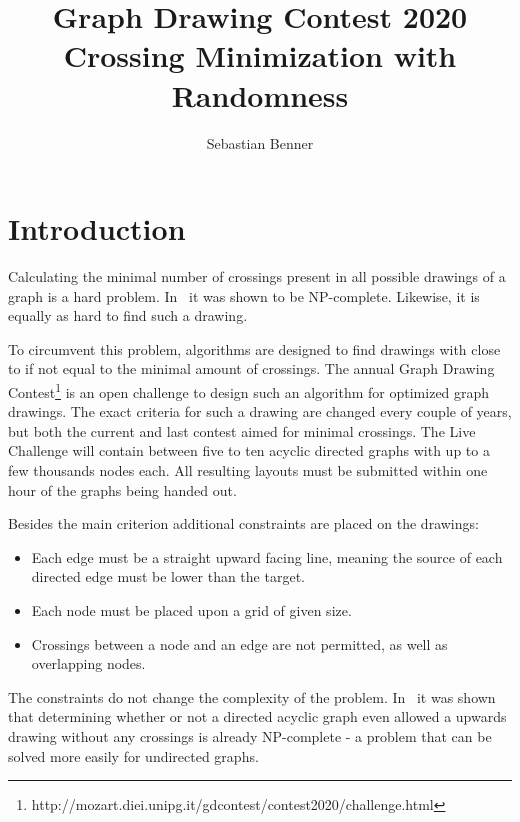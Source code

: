 \documentclass[]{llncs}
\begin{document}
    \title{Graph Drawing Contest 2020 \\
           Crossing Minimization with Randomness}
    \author{Sebastian Benner}
    \maketitle
    

    \section{Introduction} 	
	Calculating the minimal number of crossings present in all possible drawings of a graph is a hard problem. In~\cite{np} it was shown to be NP-complete. Likewise, it is equally as hard to find such a drawing.
	
	To circumvent this problem, algorithms are designed to find drawings with close to if not equal to the minimal amount of crossings. The annual Graph Drawing Contest\footnote{http://mozart.diei.unipg.it/gdcontest/contest2020/challenge.html} is an open challenge to design such an algorithm for optimized graph drawings. The exact criteria for such a drawing are changed every couple of years, but both the current and last contest aimed for minimal crossings. The Live Challenge will contain between five to ten acyclic directed graphs with up to a few thousands nodes each. All resulting layouts must be submitted within one hour of the graphs being handed out.

Besides the main criterion additional constraints are placed on the drawings:
\begin{itemize}
	\item Each edge must be a straight upward facing line, meaning the source of each directed edge must be lower than the target.
	\item Each node must be placed upon a grid of given size.
	\item Crossings between a node and an edge are not permitted, as well as overlapping nodes.
\end{itemize}
The constraints do not change the complexity of the problem. In~\cite{conf/alenex/ChimaniZ14} it was shown that determining whether or not a directed acyclic graph even allowed a upwards drawing without any crossings is already NP-complete - a problem that can be solved more easily for undirected graphs.
\end{document}
